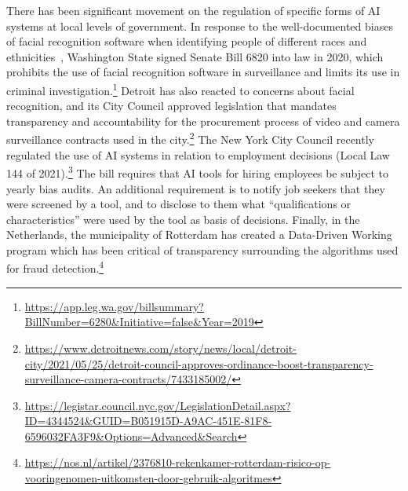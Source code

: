 There has been significant movement on the regulation of specific forms of AI systems at local levels of government. In response to the well-documented biases of facial recognition software when identifying people of different races and ethnicities~\cite{DBLP:conf/fat/BuolamwiniG18}, Washington State signed Senate Bill 6820 into law in 2020, which prohibits the use of facial recognition software in surveillance and limits its use in criminal investigation.\footnote{\url{https://app.leg.wa.gov/billsummary?BillNumber=6280&Initiative=false&Year=2019}} Detroit has also reacted to concerns about facial recognition, and its City Council approved legislation that mandates transparency and accountability for the procurement process of video and camera surveillance contracts used in the city.\footnote{\url{https://www.detroitnews.com/story/news/local/detroit-city/2021/05/25/detroit-council-approves-ordinance-boost-transparency-surveillance-camera-contracts/7433185002/}} The New York City Council recently regulated the use of AI systems in relation to employment decisions (Local Law 144 of 2021).\footnote{\url{https://legistar.council.nyc.gov/LegislationDetail.aspx?ID=4344524&GUID=B051915D-A9AC-451E-81F8-6596032FA3F9&Options=Advanced&Search}} The bill requires that AI tools for hiring employees be subject to yearly bias audits. An additional requirement is to notify job seekers that they were screened by a tool, and to disclose to them what ``qualifications or characteristics'' were used by the tool as basis of decisions. Finally, in the Netherlands, the municipality of Rotterdam has created a Data-Driven Working program which has been critical of transparency surrounding the algorithms used for fraud detection.\footnote{\url{https://nos.nl/artikel/2376810-rekenkamer-rotterdam-risico-op-vooringenomen-uitkomsten-door-gebruik-algoritmes}}


